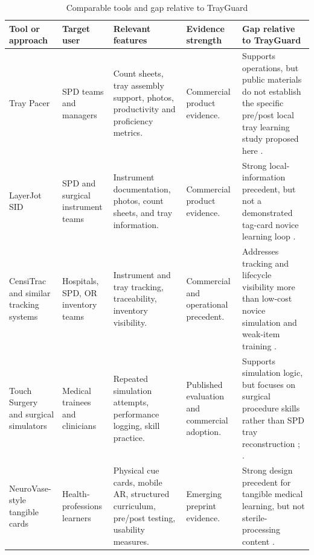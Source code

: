 \documentclass[10pt,a4paper]{article}
\begin{document}
\begin{table}[H]
\centering
\caption{Comparable tools and gap relative to TrayGuard}
\label{tab:comparable-tools-and-gap-relative-to-trayguard}
\small\renewcommand{\arraystretch}{1.2}\setlength{\tabcolsep}{3pt}
\begin{tabularx}{\textwidth}{|>{\raggedright\arraybackslash}p{2.5cm}|>{\raggedright\arraybackslash}p{2.5cm}|>{\raggedright\arraybackslash}X|>{\raggedright\arraybackslash}p{2cm}|>{\raggedright\arraybackslash}X|}
\hline
Tool or approach & Target user & Relevant features & Evidence strength & Gap relative to TrayGuard \\
\hline
Tray Pacer & SPD teams and managers & Count sheets, tray assembly support, photos, productivity and proficiency metrics. & Commercial product evidence. & Supports operations, but public materials do not establish the specific pre/post local tray learning study proposed here \cite{tray-pacer-accessed-2026}. \\
\hline
LayerJot SID & SPD and surgical instrument teams & Instrument documentation, photos, count sheets, and tray information. & Commercial product evidence. & Strong local-information precedent, but not a demonstrated tag-card novice learning loop \cite{layerjot-sid-accessed-2026}. \\
\hline
CensiTrac and similar tracking systems & Hospitals, SPD, OR inventory teams & Instrument and tray tracking, traceability, inventory visibility. & Commercial and operational precedent. & Addresses tracking and lifecycle visibility more than low-cost novice simulation and weak-item training \cite{censitrac-accessed-2026}. \\
\hline
Touch Surgery and surgical simulators & Medical trainees and clinicians & Repeated simulation attempts, performance logging, skill practice. & Published evaluation and commercial adoption. & Supports simulation logic, but focuses on surgical procedure skills rather than SPD tray reconstruction \cite{tulipan-et-al-2019}; \cite{medtronic-touch-surgery-accessed-2026}. \\
\hline
NeuroVase-style tangible cards & Health-professions learners & Physical cue cards, mobile AR, structured curriculum, pre/post testing, usability measures. & Emerging preprint evidence. & Strong design precedent for tangible medical learning, but not sterile-processing content \cite{jahani-et-al-2026-neurovase}. \\
\hline

\end{tabularx}
\end{table}
\end{document}
